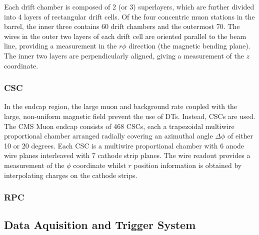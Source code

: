 Each drift chamber is composed of 2 (or 3) superlayers, which are further
divided into 4 layers of rectangular drift cells. Of the four concentric muon
stations in the barrel, the inner three contains 60 drift chambers and the
outermost 70. The wires in the outer two layers of each drift cell are oriented
parallel to the beam line, providing a measurement in the $r\phi$ direction (the
magnetic bending plane). The inner two layers are perpendicularly aligned,
giving a measurement of the $z$ coordinate.

\subsubsection{\acl{CSC}}
In the endcap region, the large muon and background rate coupled with the large,
non-uniform magnetic field prevent the use of \ac{DT}s. Instead, \acl{CSC}s are
used. The CMS Muon endcap consists of 468 \ac{CSC}s, each a trapezoidal
multiwire proportional chamber arranged radially covering an azimuthal angle
$\Delta\phi$ of either 10 or 20 degrees. Each \ac{CSC} is a multiwire
proportional chamber with 6 anode wire planes interleaved with 7 cathode strip
planes. The wire readout provides a measurement of the $\phi$ coordinate whilst
$r$ position information is obtained by interpolating charges on the cathode
strips.

\subsubsection{\acl{RPC}}

\subsection{Data Aquisition and Trigger System}
